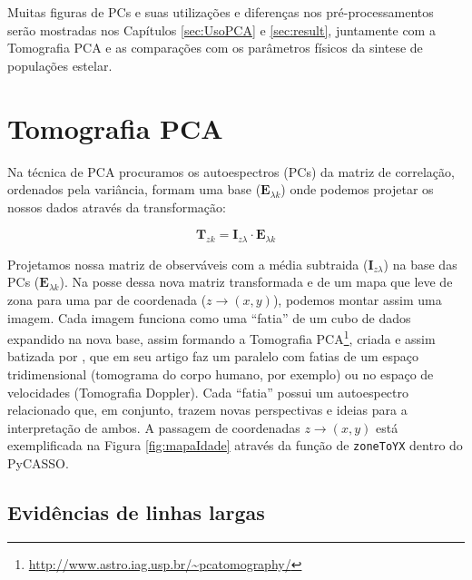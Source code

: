 Muitas figuras de PCs e suas utilizações e diferenças nos pré-processamentos
serão mostradas nos Capítulos \ref{sec:UsoPCA} e \ref{sec:result}, juntamente
com a Tomografia PCA e as comparações com os parâmetros físicos da sintese de
populações estelar.


\section{Tomografia PCA}
\label{sec:PCAeTomoPCA:TomoPCA}

Na técnica de PCA procuramos os autoespectros (PCs) da matriz de correlação,
ordenados pela variância, formam uma base ($\mathbf{E}{}_{\lambda k}$) onde 
podemos projetar os nossos dados através da transformação:

\begin{equation}
	\label{eq:TomoPCA:tomogram2D}
	\mathbf{T}{}_{z k} = \mathbf{I}{}_{z \lambda} \cdot \mathbf{E}{}_{\lambda k}
\end{equation}

Projetamos nossa matriz de observáveis com a média subtraida ($\mathbf{I}{}_{z
\lambda}$) na base das PCs ($\mathbf{E}{}_{\lambda k}$). Na posse dessa nova
matriz transformada e de um mapa que leve de zona para uma par de coordenada ($z
\to (x, y)$), podemos montar assim uma imagem. Cada imagem funciona como uma
``fatia'' de um cubo de dados expandido na nova base, assim formando a
Tomografia PCA\footnote{\url{http://www.astro.iag.usp.br/~pcatomography/}},
criada e assim batizada por \citet{Steiner2009}, que em seu artigo faz um
paralelo com fatias de um espaço tridimensional (tomograma do corpo humano, por
exemplo) ou no espaço de velocidades (Tomografia Doppler). Cada ``fatia'' possui
um autoespectro relacionado que, em conjunto, trazem novas perspectivas e ideias
para a interpretação de ambos. A passagem de coordenadas $z \to (x, y)$ está
exemplificada na Figura \ref{fig:mapaIdade} através da função de
\texttt{zoneToYX} dentro do PyCASSO.

\subsection{Evidências de linhas largas}

